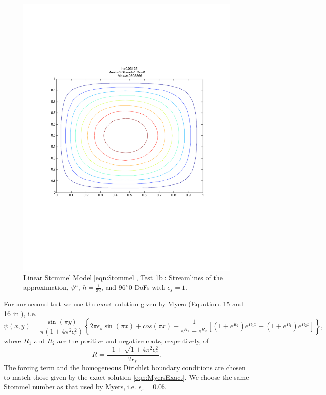 \begin{figure}%
  \begin{center}
    \includegraphics[trim=0 200 20 220, clip=true, scale=0.5]{StommelVallise1.pdf}
    \caption{Linear Stommel Model \eqref{eqn:Stommel}, Test 1b \cite{Vallis06}: Streamlines of the approximation,
    $\psi^h$, $h=\frac{1}{32}$, and $9670$ DoFs with $\epsilon_s=1$.}
    \label{fig:StommelVallise1}
  \end{center}
\end{figure}

For our second test we use the exact solution given by Myers (Equations 15 and
16 in \cite{Myers}), i.e.
{\footnotesize
\begin{equation}
  \psi(x,y) =\frac{\sin(\pi y)}{\pi(1+4\pi^2\epsilon_s^2)}\left\{2\pi\epsilon_s\sin(\pi x)+cos(\pi x)+\frac{1}{e^{R_1}-e^{R_2}}\left[(1+e^{R_2})e^{R_1x}-(1+e^{R_1})e^{R_2x}\right]\right\},
  \label{eqn:MyersExact}
\end{equation}
}
where $R_1\text{ and } R_2$ are the positive and negative roots, respectively,
of
\begin{equation*}
  R = \frac{-1\pm\sqrt{1+4\pi^2 \epsilon_s^2}}{2\epsilon_s}.
\end{equation*}
The forcing term and the homogeneous Dirichlet boundary conditions are chosen to
match those given by the exact solution \eqref{eqn:MyersExact}. We choose the
same Stommel number as that used by Myers, i.e. $\epsilon_s=0.05$.


